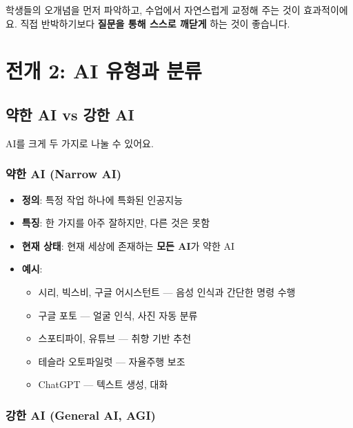 \documentclass[11pt,a4paper]{article}
\begin{document}
\begin{tipbox}
학생들의 오개념을 먼저 파악하고, 수업에서 자연스럽게 교정해 주는 것이 효과적이에요. 직접 반박하기보다 \textbf{질문을 통해 스스로 깨닫게} 하는 것이 좋습니다.
\end{tipbox}



\section{ 전개 2: AI 유형과 분류}

\subsection{약한 AI vs 강한 AI}

AI를 크게 두 가지로 나눌 수 있어요.

\subsubsection{ 약한 AI (Narrow AI)}

\begin{itemize}[leftmargin=*]
    \item \textbf{정의}: 특정 작업 하나에 특화된 인공지능
    \item \textbf{특징}: 한 가지를 아주 잘하지만, 다른 것은 못함
    \item \textbf{현재 상태}: 현재 세상에 존재하는 \textbf{모든 AI}가 약한 AI
    \item \textbf{예시}:
    \begin{itemize}
        \item {} 시리, 빅스비, 구글 어시스턴트 — 음성 인식과 간단한 명령 수행
        \item {} 구글 포토 — 얼굴 인식, 사진 자동 분류
        \item {} 스포티파이, 유튜브 — 취향 기반 추천
        \item {} 테슬라 오토파일럿 — 자율주행 보조
        \item {} ChatGPT — 텍스트 생성, 대화
    \end{itemize}
\end{itemize}

\subsubsection{ 강한 AI (General AI, AGI)}
\end{document}
